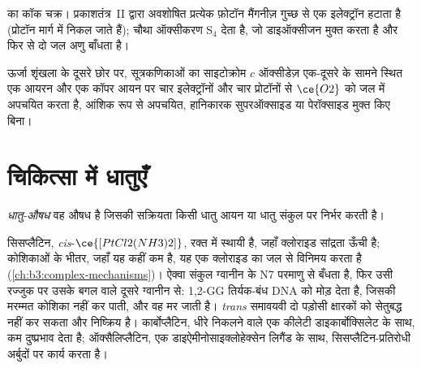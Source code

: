 \begin{omfigure}

{\small {} का कॉक चक्र। प्रकाशतंत्र~II द्वारा अवशोषित प्रत्येक फ़ोटॉन
मैंगनीज़ गुच्छ से एक इलेक्ट्रॉन हटाता है (प्रोटॉन
मार्ग में निकल जाते हैं); चौथा ऑक्सीकरण $\mathrm S_4$ देता है, जो डाइऑक्सीजन मुक्त करता है और
फिर से दो जल अणु बाँधता है।}
\end{omfigure}

ऊर्जा शृंखला के दूसरे छोर पर, सूत्रकणिकाओं का साइटोक्रोम $c$ ऑक्सीडेज़
एक-दूसरे के सामने स्थित एक  आयरन और एक कॉपर आयन पर चार इलेक्ट्रॉनों और चार प्रोटॉनों से
$\ce{O2}$ को जल में अपचयित करता है, आंशिक रूप से अपचयित, हानिकारक सुपरऑक्साइड या पेरॉक्साइड
मुक्त किए बिना।

\section{चिकित्सा में धातुएँ}

\begin{definition}[धातु-औषधें]\label{def:b3:bioinorganic:metallodrug}
\emph{धातु-औषध} वह औषध है जिसकी सक्रियता किसी
धातु आयन या धातु संकुल पर निर्भर करती है।
\end{definition}

सिसप्लैटिन, \textit{cis}-$\ce{[PtCl2(NH3)2]}$, रक्त में स्थायी है, जहाँ क्लोराइड सांद्रता
ऊँची है; कोशिकाओं के भीतर, जहाँ यह कहीं कम है, यह एक क्लोराइड का जल से विनिमय करता है
(\cref{ch:b3:complex-mechanisms})। ऐक्वा संकुल ग्वानीन के N7 परमाणु से बँधता है,
फिर उसी रज्जुक पर उसके बगल वाले दूसरे ग्वानीन से: 1,2-GG
तिर्यक-बंध DNA को मोड़ देता है, जिसकी मरम्मत कोशिका नहीं कर पाती, और वह मर जाती है।
\textit{trans} समावयवी दो पड़ोसी क्षारकों को सेतुबद्ध नहीं कर सकता और निष्क्रिय है।
कार्बोप्लैटिन, धीरे निकलने वाले एक कीलेटी डाइकार्बोक्सिलेट के साथ, कम
दुष्प्रभाव देता है; ऑक्सैलिप्लैटिन, एक डाइऐमीनोसाइक्लोहेक्सेन लिगैंड के साथ, सिसप्लैटिन-प्रतिरोधी
अर्बुदों पर कार्य करता है।

